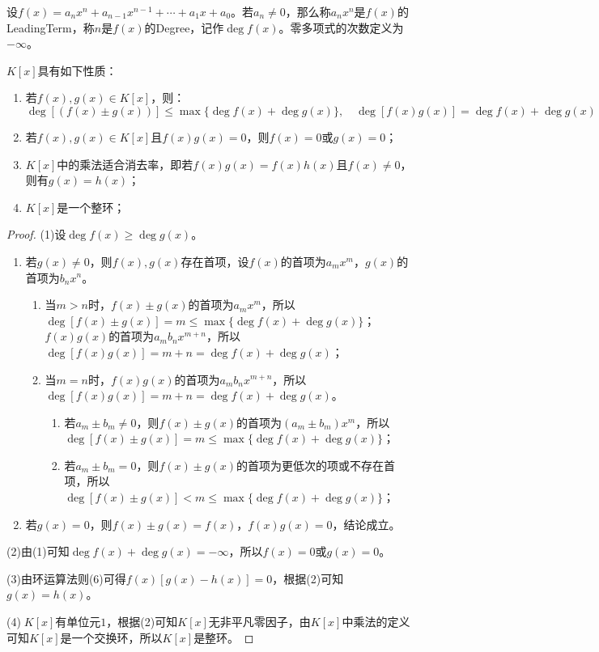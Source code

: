 \begin{definition}
	设$f(x)=a_nx^n+a_{n-1}x^{n-1}+\cdots+a_1x+a_0$。若$a_n\ne0$，那么称$a_nx^n$是$f(x)$的\gls{LeadingTerm}，称$n$是$f(x)$的\gls{Degree}，记作$\deg f(x)$。零多项式的次数定义为$-\infty$。
\end{definition}
\begin{property}\label{prop:UnivariatePolynomialRing}
	$K[x]$具有如下性质：
	\begin{enumerate}
		\item 若$f(x),g(x)\in K[x]$，则：
		\begin{equation*}
			\deg[(f(x)\pm g(x))]\leqslant\max\{\deg f(x)+\deg g(x)\},\quad\deg[f(x)g(x)]=\deg f(x)+\deg g(x)
		\end{equation*}
		\item 若$f(x),g(x)\in K[x]$且$f(x)g(x)=0$，则$f(x)=0$或$g(x)=0$；
		\item $K[x]$中的乘法适合消去率，即若$f(x)g(x)=f(x)h(x)$且$f(x)\ne0$，则有$g(x)=h(x)$；
		\item $K[x]$是一个整环；
	\end{enumerate}
\end{property}
\begin{proof}
	(1)设$\deg f(x)\geqslant\deg g(x)$。\par
	\begin{enumerate}
		\item 若$g(x)\ne0$，则$f(x),g(x)$存在首项，设$f(x)$的首项为$a_mx^m$，$g(x)$的首项为$b_nx^n$。
		\begin{enumerate}
			\item 当$m>n$时，$f(x)\pm g(x)$的首项为$a_mx^m$，所以$\deg[f(x)\pm g(x)]=m\leqslant\max\{\deg f(x)+\deg g(x)\}$；$f(x)g(x)$的首项为$a_mb_nx^{m+n}$，所以$\deg[f(x)g(x)]=m+n=\deg f(x)+\deg g(x)$；
			\item 当$m=n$时，$f(x)g(x)$的首项为$a_mb_nx^{m+n}$，所以$\deg[f(x)g(x)]=m+n=\deg f(x)+\deg g(x)$。
			\begin{enumerate}
				\item 若$a_m\pm b_m\ne0$，则$f(x)\pm g(x)$的首项为$(a_m\pm b_m)x^m$，所以$\deg[f(x)\pm g(x)]=m\leqslant\max\{\deg f(x)+\deg g(x)\}$；
				\item 若$a_m\pm b_m=0$，则$f(x)\pm g(x)$的首项为更低次的项或不存在首项，所以$\deg[f(x)\pm g(x)]<m\leqslant\max\{\deg f(x)+\deg g(x)\}$；
			\end{enumerate}
		\end{enumerate}
		\item 若$g(x)=0$，则$f(x)\pm g(x)=f(x)$，$f(x)g(x)=0$，结论成立。
	\end{enumerate}\par
	(2)由(1)可知$\deg f(x)+\deg g(x)=-\infty$，所以$f(x)=0$或$g(x)=0$。\par
	(3)由环运算法则(6)可得$f(x)[g(x)-h(x)]=0$，根据(2)可知$g(x)=h(x)$。\par
	(4)$\;K[x]$有单位元$1$，根据(2)可知$K[x]$无非平凡零因子，由$K[x]$中乘法的定义可知$K[x]$是一个交换环，所以$K[x]$是整环。
\end{proof}

